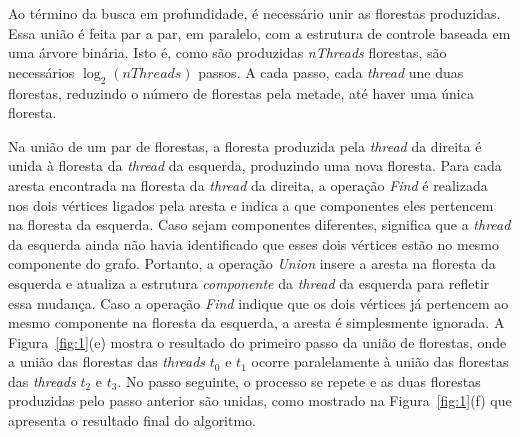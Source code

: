 \documentclass[12pt]{article}
\begin{document}
Ao término da busca em profundidade, é necessário unir as florestas produzidas. Essa união é feita par a par, em paralelo, com a estrutura de controle baseada em uma árvore binária. Isto é, como são produzidas \emph{nThreads} florestas, são necessários $\log_2(nThreads)$ passos. A cada passo, cada \emph{thread} une duas florestas, reduzindo o número de florestas pela metade, até haver uma única floresta.

Na união de um par de florestas, a floresta produzida pela \emph{thread} da direita é unida à floresta da \emph{thread} da esquerda, produzindo uma nova floresta. Para cada aresta encontrada na floresta da \emph{thread} da direita, a operação \emph{Find} é realizada nos dois vértices ligados pela aresta e indica a que componentes eles pertencem na floresta da esquerda. Caso sejam componentes diferentes, significa que a \emph{thread} da esquerda ainda não havia identificado que esses dois vértices estão no mesmo componente do grafo. Portanto, a operação \emph{Union} insere a aresta na floresta da esquerda e atualiza a estrutura \emph{componente} da \emph{thread} da esquerda para refletir essa mudança. Caso a operação \emph{Find} indique que os dois vértices já pertencem ao mesmo componente na floresta da esquerda, a aresta é simplesmente ignorada. A Figura~\ref{fig:1}(e) mostra o resultado do primeiro passo da união de florestas, onde a união das florestas das \emph{threads} $t_0$ e $t_1$ ocorre paralelamente à união das florestas das \emph{threads} $t_2$ e $t_3$. No passo seguinte, o processo se repete e as duas florestas produzidas pelo passo anterior são unidas, como mostrado na Figura~\ref{fig:1}(f) que apresenta o resultado final do algoritmo.
\end{document}
